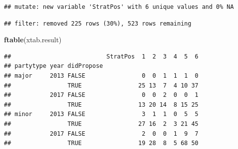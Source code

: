 \documentclass[
]{article}
\newenvironment{Shaded}{\begin{snugshade}}{\end{snugshade}}
\newcommand{\CommentTok}[1]{\textcolor[rgb]{0.56,0.35,0.01}{\textit{#1}}}
\newcommand{\DataTypeTok}[1]{\textcolor[rgb]{0.13,0.29,0.53}{#1}}
\newcommand{\KeywordTok}[1]{\textcolor[rgb]{0.13,0.29,0.53}{\textbf{#1}}}
\newcommand{\NormalTok}[1]{#1}
\newcommand{\OperatorTok}[1]{\textcolor[rgb]{0.81,0.36,0.00}{\textbf{#1}}}
\newcommand{\OtherTok}[1]{\textcolor[rgb]{0.56,0.35,0.01}{#1}}
\newcommand{\StringTok}[1]{\textcolor[rgb]{0.31,0.60,0.02}{#1}}
\begin{document}
\begin{verbatim}
## mutate: new variable 'StratPos' with 6 unique values and 0% NA
\end{verbatim}

\begin{Shaded}
\end{Shaded}

\begin{verbatim}
## filter: removed 225 rows (30%), 523 rows remaining
\end{verbatim}

\begin{Shaded}
\begin{Highlighting}[]
\KeywordTok{ftable}\NormalTok{(xtab.result)}
\end{Highlighting}
\end{Shaded}

\begin{verbatim}
##                           StratPos  1  2  3  4  5  6
## partytype year didPropose                           
## major     2013 FALSE                0  0  1  1  1  0
##                TRUE                25 13  7  4 10 37
##           2017 FALSE                0  0  2  0  0  1
##                TRUE                13 20 14  8 15 25
## minor     2013 FALSE                3  1  1  0  5  5
##                TRUE                27 16  2  3 21 45
##           2017 FALSE                2  0  0  1  9  7
##                TRUE                19 28  8  5 68 50
\end{verbatim}

\begin{Shaded}
\end{Shaded}
\end{document}
